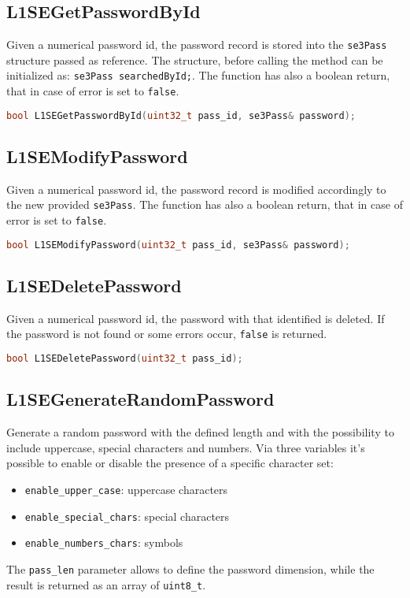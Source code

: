 \subsection{L1SEGetPasswordById}
Given a numerical password id, the password record is stored into the \texttt{se3Pass} structure passed as reference. The structure, before calling the method can be initialized as: \texttt{se3Pass searchedById;}.
The function has also a boolean return, that in case of error is set to \texttt{false}.

\begin{lstlisting}[language=C++,breaklines=true]
	bool L1SEGetPasswordById(uint32_t pass_id, se3Pass& password);
\end{lstlisting}

\subsection{L1SEModifyPassword}
Given a numerical password id, the password record is modified accordingly to the new provided \texttt{se3Pass}.
The function has also a boolean return, that in case of error is set to \texttt{false}.
\begin{lstlisting}[language=C++,breaklines=true]
	bool L1SEModifyPassword(uint32_t pass_id, se3Pass& password);
\end{lstlisting}

\subsection{L1SEDeletePassword}
Given a numerical password id, the password with that identified is deleted. If the password is not found or some errors occur, \texttt{false} is returned.
\begin{lstlisting}[language=C++,breaklines=true]
	bool L1SEDeletePassword(uint32_t pass_id);
\end{lstlisting}

\subsection{L1SEGenerateRandomPassword}
Generate a random password with the defined length and with the possibility to include uppercase, special characters and numbers. Via three variables it's possible to enable or disable the presence of a specific character set:
\begin{itemize}
	\itemsep0sp
	\item \texttt{enable\_upper\_case}: uppercase characters
	\item \texttt{enable\_special\_chars}: special characters
	\item \texttt{enable\_numbers\_chars}: symbols
\end{itemize}
The \texttt{pass\_len} parameter allows to define the password dimension, while the result is returned as an array of \texttt{uint8\_t}.

